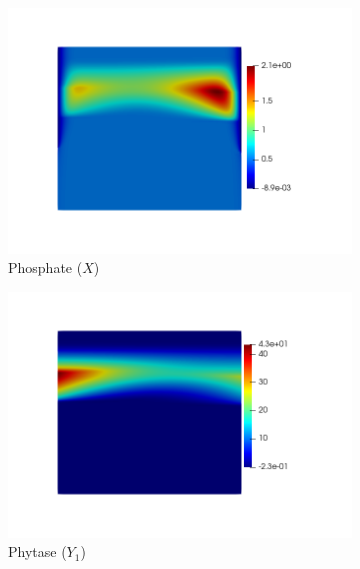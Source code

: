 \documentclass[11pt]{article}
\begin{document}
\begin{figure}[!htb]
\centering
\begin{subfigure}[t]{0.3\textwidth}
    \includegraphics[trim= 100 100 70 100,width=\textwidth]{Figures/X.png}
    \caption{Phosphate ($X$)}
\end{subfigure}
\qquad
\begin{subfigure}[t]{0.3\textwidth}
    \includegraphics[trim= 100 100 70 100,width=\textwidth]{Figures/Y1.png}
    \caption{Phytase ($Y_1$)}
\end{subfigure}
\qquad
\begin{subfigure}[t]{0.3\textwidth}

\end{subfigure}
\end{figure}
\end{document}
